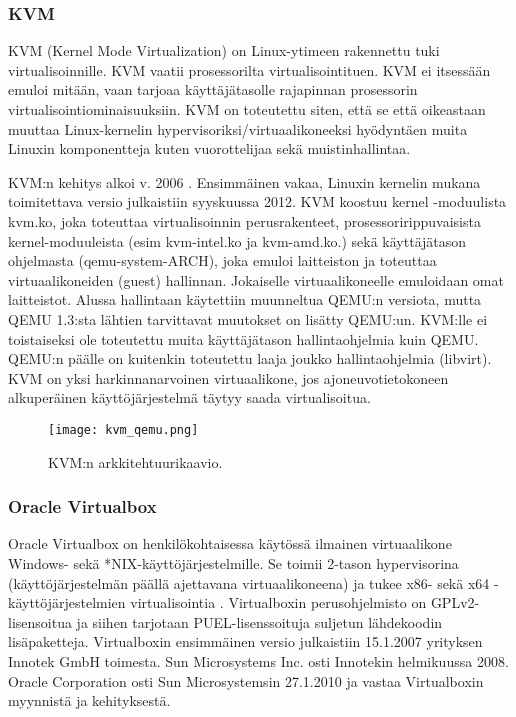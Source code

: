 \subsubsection{KVM}
KVM (Kernel Mode Virtualization) on Linux-ytimeen rakennettu tuki virtualisoinnille. KVM vaatii prosessorilta virtualisointituen. KVM ei itsessään emuloi mitään, vaan tarjoaa käyttäjätasolle rajapinnan prosessorin virtualisointiominaisuuksiin. KVM on toteutettu siten, että se että oikeastaan muuttaa Linux-kernelin hypervisoriksi/virtuaalikoneeksi hyödyntäen muita Linuxin komponentteja kuten vuorottelijaa sekä muistinhallintaa. \cite{kvm1}

KVM:n kehitys alkoi v. 2006 \cite{kvm3}. Ensimmäinen vakaa, Linuxin kernelin mukana toimitettava versio julkaistiin syyskuussa 2012. KVM koostuu kernel -moduulista kvm.ko, joka toteuttaa virtualisoinnin perusrakenteet, prosessoririppuvaisista kernel-moduuleista (esim kvm-intel.ko ja kvm-amd.ko.) sekä käyttäjätason ohjelmasta (qemu-system-ARCH), joka emuloi laitteiston ja toteuttaa virtuaalikoneiden (guest) hallinnan. Jokaiselle virtuaalikoneelle emuloidaan omat laitteistot. Alussa hallintaan käytettiin muunneltua QEMU:n versiota, mutta QEMU 1.3:sta lähtien tarvittavat muutokset on lisätty QEMU:un. KVM:lle ei toistaiseksi ole toteutettu muita käyttäjätason hallintaohjelmia kuin QEMU. QEMU:n päälle on kuitenkin toteutettu laaja joukko hallintaohjelmia (libvirt). \cite{kvm2} KVM on yksi harkinnanarvoinen virtuaalikone, jos ajoneuvotietokoneen alkuperäinen käyttöjärjestelmä täytyy saada virtualisoitua.


\begin{figure}[H]
\centering
\texttt{[image: kvm\_qemu.png]}
\caption{KVM:n arkkitehtuurikaavio.\cite{kvm4}}
\end{figure}

\subsubsection{Oracle Virtualbox}

Oracle Virtualbox on henkilökohtaisessa käytössä ilmainen virtuaalikone Windows- sekä *NIX-käyttöjärjestelmille. Se toimii 2-tason hypervisorina (käyttöjärjestelmän päällä ajettavana virtuaalikoneena) ja tukee x86- sekä x64 -käyttöjärjestelmien virtualisointia \cite{virtualbox_manual}. Virtualboxin perusohjelmisto on GPLv2-lisensoitua ja siihen tarjotaan  PUEL-lisenssoituja suljetun lähdekoodin lisäpaketteja. Virtualboxin ensimmäinen versio julkaistiin 15.1.2007 yrityksen Innotek GmbH toimesta. Sun Microsystems Inc. osti Innotekin helmikuussa 2008. Oracle Corporation osti Sun Microsystemsin 27.1.2010 ja vastaa Virtualboxin myynnistä ja kehityksestä.


